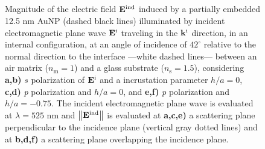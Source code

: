 \begin{figure}[t!]\centering
   \def\svgwidth{.75\textwidth}
   \footnotesize
   \\[-47.25em]
   \hspace*{-.25\textwidth}
       \begin{subfigure}{.25\textwidth}\textcolor{red}{\caption{ } \label{sfig:Near:Inc0:42:s1}}\end{subfigure}%
       \begin{subfigure}{.34\textwidth}\caption{ }\label{sfig:Near:Inc0:42:s2}\end{subfigure}\\[13em]
   \hspace*{-.25\textwidth}
       \begin{subfigure}{.25\textwidth}\textcolor{red}{\caption{ } \label{sfig:Near:Inc0:42:p1}}\end{subfigure}%
       \begin{subfigure}{.34\textwidth}\caption{ }\label{sfig:Near:Inc0:42:p2}\end{subfigure}\\[13em]
    \hspace*{-.25\textwidth}
       \begin{subfigure}{.25\textwidth}\textcolor{red}{\caption{ } \label{sfig:Near:Inc-75:42:p1}}\end{subfigure}%
       \begin{subfigure}{.34\textwidth}\caption{ }\label{sfig:Near:Inc-75:42:p2}\end{subfigure}\\[15em]
   \caption[Induced Electric Field of a 12.5 nm Au NP on substrate illuminated at oblique incidence with a $s$ polarized electric field]{%
   Magnitude of the electric field $\vb{E}^\text{ind}$ induced by a partially embedded 12.5 nm AuNP (dashed black lines)  illuminated by incident electromagnetic plane wave $\vb{E}^\text{i}$ traveling in the $\vb{k}^\text{i}$ direction, in an internal configuration, at an angle of incidence of  $42^\circ$ relative to the normal direction to the interface ---white dashed lines--- between an air matrix ($n_\text{m} = 1$) and a glass substrate ($n_\text{s} = 1.5$), considering \textbf{a,b)} $s$ polarization of $\vb{E}^\text{i}$ and a incrustation parameter $h/a=0$, \textbf{c,d)} \textit{p} polarization and $h/a=0$, and \textbf{e,f)}  \textit{p} polarization and $h/a=-0.75$. The incident electromagnetic plane wave is evaluated at $\lambda = 525$ nm and  $\norm{\vb{E}^\text{ind}}$ is evaluated at  \textbf{a,c,e)} a scattering plane perpendicular to the incidence plane (vertical gray dotted lines) and at \textbf{b,d,f)} a scattering plane overlapping the incidence plane. }
   \label{fig:Near:Inc:Obl}
 \end{figure}

